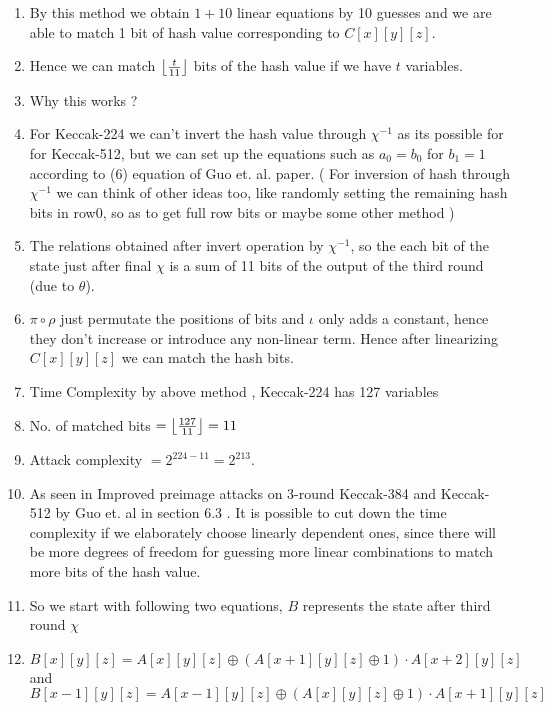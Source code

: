 \documentclass{article}
\DeclarePairedDelimiter\floor{\lfloor}{\rfloor}
\begin{document}
\begin{enumerate}
    \item By this method we obtain $ 1 + 10 $ linear equations by 10 guesses and we are able to match 1 bit of hash value corresponding to $C[x][y][z]$.
    
    \item Hence we can match $\floor*{ \frac{t}{11} }$ bits of the hash value if we have $t$ variables.
    
    \item Why this works ?
    
    \item For Keccak-224 we can't invert the hash value through $\chi^{-1}$ as its possible for for Keccak-512, but we can set up the equations such as $a_0 = b_0$ for $b_1 = 1$ according to (6) equation of Guo et. al. paper. ( For inversion of hash through $\chi^{-1}$ we can think of other ideas too, like randomly setting the remaining hash bits in row0, so as to get full row bits or maybe some other method )
    
    \item The relations obtained after invert operation by $\chi^{-1}$, so the each bit of the state just after final $\chi$ is a sum of 11 bits of the output of the third round (due to $\theta$).
    
    \item $\pi \circ \rho$ just permutate the positions of bits and $\iota$ only adds a constant, hence they don't increase or introduce any non-linear term. Hence after linearizing $C[x][y][z]$ we can match the hash bits.
    
    \item Time Complexity by above method , Keccak-224 has 127 variables
    \item No. of matched bits $ = \floor*{ \frac{127}{11} } = 11 $
    \item Attack complexity $ = 2^{224 - 11} = 2^{213}$.
    
    \item As seen in Improved preimage attacks on 3-round Keccak-384 and Keccak-512 by Guo et. al in section 6.3 . It is possible to cut down the time complexity if we elaborately choose linearly dependent ones, since there will be more degrees of freedom for guessing more linear combinations to match more bits of the hash value.
    
    \item So we start with following two equations, $B$ represents the state after third round $\chi$
    
    \item 
		\[
			B[x][y][z] = A[x][y][z] \oplus (A[x+1][y][z] \oplus 1) \cdot A[x+2][y][z]
		\] and
		\[
			B[x-1][y][z] = A[x-1][y][z] \oplus (A[x][y][z] \oplus 1) \cdot A[x+1][y][z]
		\]


\end{enumerate}
\end{document}
